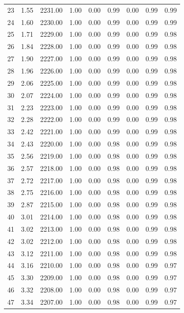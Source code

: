 \documentclass{article}\usepackage[]{graphicx}\usepackage[]{color}
\begin{document}
\begin{longtable}{rrrrrrrrr}
  23 & 1.55 & 2231.00 & 1.00 & 0.00 & 0.99 & 0.00 & 0.99 & 0.99 \\ 
  24 & 1.60 & 2230.00 & 1.00 & 0.00 & 0.99 & 0.00 & 0.99 & 0.99 \\ 
  25 & 1.71 & 2229.00 & 1.00 & 0.00 & 0.99 & 0.00 & 0.99 & 0.98 \\ 
  26 & 1.84 & 2228.00 & 1.00 & 0.00 & 0.99 & 0.00 & 0.99 & 0.98 \\ 
  27 & 1.90 & 2227.00 & 1.00 & 0.00 & 0.99 & 0.00 & 0.99 & 0.98 \\ 
  28 & 1.96 & 2226.00 & 1.00 & 0.00 & 0.99 & 0.00 & 0.99 & 0.98 \\ 
  29 & 2.06 & 2225.00 & 1.00 & 0.00 & 0.99 & 0.00 & 0.99 & 0.98 \\ 
  30 & 2.07 & 2224.00 & 1.00 & 0.00 & 0.99 & 0.00 & 0.99 & 0.98 \\ 
  31 & 2.23 & 2223.00 & 1.00 & 0.00 & 0.99 & 0.00 & 0.99 & 0.98 \\ 
  32 & 2.28 & 2222.00 & 1.00 & 0.00 & 0.99 & 0.00 & 0.99 & 0.98 \\ 
  33 & 2.42 & 2221.00 & 1.00 & 0.00 & 0.99 & 0.00 & 0.99 & 0.98 \\ 
  34 & 2.43 & 2220.00 & 1.00 & 0.00 & 0.98 & 0.00 & 0.99 & 0.98 \\ 
  35 & 2.56 & 2219.00 & 1.00 & 0.00 & 0.98 & 0.00 & 0.99 & 0.98 \\ 
  36 & 2.57 & 2218.00 & 1.00 & 0.00 & 0.98 & 0.00 & 0.99 & 0.98 \\ 
  37 & 2.72 & 2217.00 & 1.00 & 0.00 & 0.98 & 0.00 & 0.99 & 0.98 \\ 
  38 & 2.75 & 2216.00 & 1.00 & 0.00 & 0.98 & 0.00 & 0.99 & 0.98 \\ 
  39 & 2.87 & 2215.00 & 1.00 & 0.00 & 0.98 & 0.00 & 0.99 & 0.98 \\ 
  40 & 3.01 & 2214.00 & 1.00 & 0.00 & 0.98 & 0.00 & 0.99 & 0.98 \\ 
  41 & 3.02 & 2213.00 & 1.00 & 0.00 & 0.98 & 0.00 & 0.99 & 0.98 \\ 
  42 & 3.02 & 2212.00 & 1.00 & 0.00 & 0.98 & 0.00 & 0.99 & 0.98 \\ 
  43 & 3.12 & 2211.00 & 1.00 & 0.00 & 0.98 & 0.00 & 0.99 & 0.98 \\ 
  44 & 3.16 & 2210.00 & 1.00 & 0.00 & 0.98 & 0.00 & 0.99 & 0.97 \\ 
  45 & 3.30 & 2209.00 & 1.00 & 0.00 & 0.98 & 0.00 & 0.99 & 0.97 \\ 
  46 & 3.32 & 2208.00 & 1.00 & 0.00 & 0.98 & 0.00 & 0.99 & 0.97 \\ 
  47 & 3.34 & 2207.00 & 1.00 & 0.00 & 0.98 & 0.00 & 0.99 & 0.97 \\ 

\end{longtable}
\end{document}
